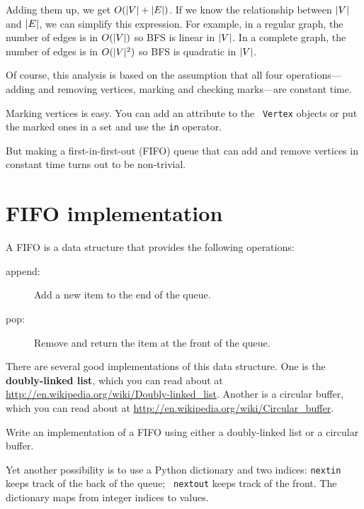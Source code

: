 \documentclass[10pt]{book}
\begin{document}
Adding them up, we get $O(|V| + |E|)$.  If we know the relationship
between $|V|$ and $|E|$, we can simplify this expression.  For
example, in a regular graph, the number of edges is in $O(|V|)$ so BFS
is linear in $|V|$.  In a complete graph, the number of edges is in
$O(|V|^2)$ so BFS is quadratic in $|V|$.

Of course, this analysis is based on the assumption that all four
operations---adding and removing vertices, marking and checking
marks---are constant time.

Marking vertices is easy.  You can add an attribute to the {\tt
  Vertex} objects or put the marked ones in a set and use
the {\tt in} operator.

But making a first-in-first-out (FIFO) queue that can add and remove
vertices in constant time turns out to be non-trivial.


\section{FIFO implementation}

A FIFO is a data structure that provides the following operations:

\begin{description}

\item[append:] Add a new item to the end of the queue.

\item[pop:] Remove and return the item at the front of the queue.

\end{description}

There are several good implementations of this data structure.
One is the {\bf doubly-linked list}, which
you can read about at \url{http://en.wikipedia.org/wiki/Doubly-linked_list}.
Another is a circular buffer, which you can read about at
\url{http://en.wikipedia.org/wiki/Circular_buffer}.

\begin{exercise}

Write an implementation of a FIFO using either a doubly-linked
list or a circular buffer.

\end{exercise}

Yet another possibility is to use a Python dictionary and
two indices: {\tt nextin} keeps track of the back of the queue; {\tt
  nextout} keeps track of the front.  The dictionary maps from
integer indices to values.
\end{document}

